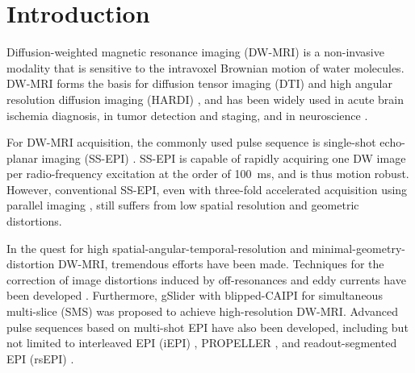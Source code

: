 \documentclass[preprint,12pt,authoryear,review]{elsarticle}
\begin{document}
    \pagebreak
    \linenumbers

    \section{Introduction}
    \label{SEC:Intr}

    Diffusion-weighted magnetic resonance imaging (DW-MRI)
    \citep{lebihan_1986_diff,merboldt_1985_diff} is a non-invasive modality
    that is sensitive to the intravoxel Brownian motion of water molecules.
    DW-MRI forms the basis for diffusion tensor imaging (DTI) \citep{basser_1994_dmri,mori_2001_track}
    and high angular resolution diffusion imaging (HARDI) \citep{tuch_2002_hardi},
    and has been widely used in acute brain ischemia diagnosis, in tumor detection and staging,
    and in neuroscience \citep{jones_2010_diff}.

    For DW-MRI acquisition, the commonly used pulse sequence is
    single-shot echo-planar imaging (SS-EPI) \citep{mansfield_1977_epi}.
    SS-EPI is capable of rapidly acquiring one DW image per radio-frequency excitation
    at the order of \SI{100}{\ms}, and is thus motion robust.
    However, conventional SS-EPI,
    even with three-fold accelerated acquisition \citep{bammer_2001_epi_sense}
    using parallel imaging
    \citep{roemer_1990_pi,ra_1993_sense,pruessmann_1999_sense,griswold_2002_grappa},
    still suffers from low spatial resolution and geometric distortions.

    In the quest for high spatial-angular-temporal-resolution
    and minimal-geometry-distortion DW-MRI,
    tremendous efforts have been made.
    Techniques for the correction of image distortions
    induced by off-resonances and eddy currents
    have been developed \citep{andersson_2003_topup}.
    Furthermore, gSlider \citep{setsompop_2018_gslider} with
    blipped-CAIPI \citep{setsompop_2012_blipped}
    for simultaneous multi-slice (SMS)
    \citep{maudsley_1980_sms,breuer_2005_caipi}
    was proposed to achieve high-resolution DW-MRI.
    Advanced pulse sequences based on
    multi-shot EPI have also been developed,
    including but not limited to interleaved EPI (iEPI)
    \citep{butts_1993_iepi},
    PROPELLER \citep{pipe_2002_blade}, and
    readout-segmented EPI (rsEPI)
    \citep{porter_2009_resolve,heidemann_2010_resolve7t}.
\end{document}
